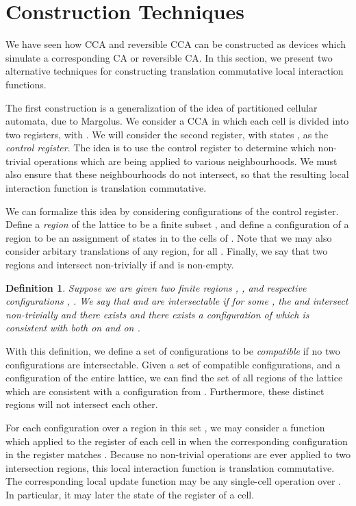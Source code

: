 \documentclass{jca}
\newtheorem{definition}{Definition}
\begin{document}
\section{Construction Techniques}\label{sec:Con}


We have seen how CCA and reversible CCA can be constructed as devices which simulate a corresponding CA or reversible CA.
In this section, we present two alternative techniques for constructing translation commutative local interaction functions.

The first construction is a generalization of the idea of partitioned cellular automata, due to Margolus\cite{cabook}.
We consider a CCA in which each cell is divided into two registers, with .
We will consider the second register, with states , as the \emph{control register}.
The idea is to use the control register to determine which non-trivial operations which are being applied to various neighbourhoods.
We must also ensure that these neighbourhoods do not intersect, so that the resulting local interaction function is translation commutative.

We can formalize this idea by considering configurations of the control register.
Define a \emph{region} of the lattice to be a finite subset , and define a configuration of a region to be an assignment of states in  to the cells of .
Note that we may also consider arbitary translations  of any region, for all .
Finally, we say that two regions  and  intersect non-trivially if  and  is non-empty.
\begin{definition}
Suppose we are given two finite regions , , and respective configurations , .
We say that  and  are \emph{intersectable} if for some , the  and  intersect non-trivially and there exists and there exists a configuration  of  which is consistent with both  on  and  on .
\end{definition}
With this definition, we define a set of configurations to be \emph{compatible} if no two configurations are intersectable.
Given a set  of compatible configurations, and a configuration of the entire lattice, we can find the set of all regions of the lattice which are consistent with a configuration from .
Furthermore, these distinct regions will not intersect each other.

For each configuration  over a region  in this set , we may consider a function  which applied to the  register of each cell in  when the corresponding configuration in the  register matches .
Because no non-trivial operations are ever applied to two intersection regions, this local interaction function is translation commutative.
The corresponding local update function may be any single-cell operation over .
In particular, it may later the state of the  register of a cell.
\end{document}
